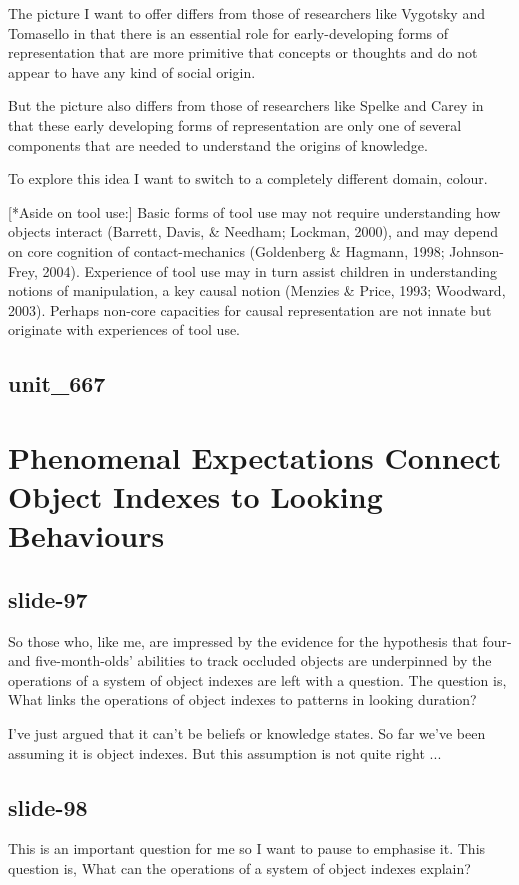 \documentclass[12pt,\papersize]{extarticle}
\begin{document}
The picture I want to offer differs from those of researchers like Vygotsky and Tomasello in
that there is an essential role for early-developing forms of representation that are more
primitive that concepts or thoughts and do not appear to have any kind of social origin.

But the picture also differs from those of researchers like Spelke and Carey in that these
early developing forms of representation are only one of several components that are needed
to understand the origins of knowledge.

To explore this idea I want to switch to a completely different domain, colour.

[*Aside on tool use:]
Basic forms of tool use may not require understanding how objects interact
(Barrett, Davis, \& Needham; Lockman, 2000), and may depend on core cognition of
contact-mechanics (Goldenberg \& Hagmann, 1998; Johnson-Frey, 2004).
Experience of tool use may in turn assist children in understanding notions of manipulation,
a key causal notion (Menzies \& Price, 1993; Woodward, 2003). Perhaps non-core capacities for
causal representation are not innate but originate with experiences of tool use.

\subsection{unit\_667}


\section{Phenomenal Expectations Connect Object Indexes to Looking Behaviours}

\subsection{slide-97}
So those who, like me, are impressed by the evidence for the hypothesis
that four- and five-month-olds’ abilities to track occluded objects
are underpinned by the operations of a system of object indexes
are left with a question.
The question is, What links the operations of object indexes to
patterns in looking duration?

I’ve just argued that it can’t be beliefs or knowledge states.
So far we’ve been assuming it is object indexes.  But this
assumption is not quite right ...

\subsection{slide-98}
This is an important question for me so I want to pause to emphasise it.
This question is, What can the operations of a system of
object indexes explain?
\end{document}
